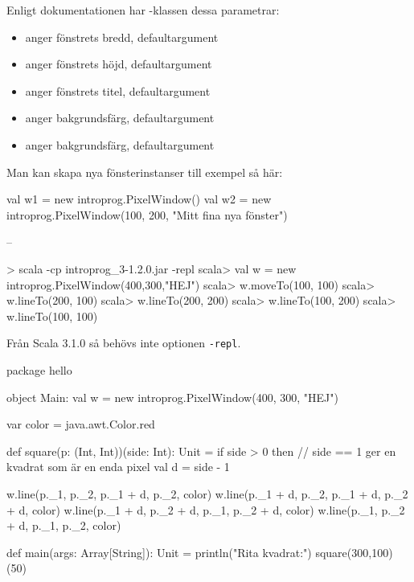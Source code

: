 \SubtaskSolved Enligt dokumentationen har -klassen dessa parametrar:
\begin{itemize}[nolistsep,noitemsep]
  \item {} anger fönstrets bredd, defaultargument 
  \item {} anger fönstrets höjd, defaultargument 
  \item {} anger fönstrets titel, defaultargument 
  \item {} anger bakgrundsfärg, defaultargument 
  \item {} anger bakgrundsfärg, defaultargument 
\end{itemize}
Man kan skapa nya fönsterinstanser till exempel så här:
\begin{Code}
val w1 = new introprog.PixelWindow()
val w2 = new introprog.PixelWindow(100, 200, "Mitt fina nya fönster")
\end{Code}

\SubtaskSolved --

\SubtaskSolved
\begin{REPL}
> scala -cp introprog_3-1.2.0.jar -repl
scala> val w = new introprog.PixelWindow(400,300,"HEJ")
scala> w.moveTo(100, 100)
scala> w.lineTo(200, 100)
scala> w.lineTo(200, 200)
scala> w.lineTo(100, 200)
scala> w.lineTo(100, 100)
\end{REPL}
Från Scala 3.1.0 så behövs inte optionen \texttt{-repl}.

\SubtaskSolved
\begin{Code}
package hello

object Main:
  val w = new introprog.PixelWindow(400, 300, "HEJ")

  var color = java.awt.Color.red

  def square(p: (Int, Int))(side: Int): Unit =
    if side > 0 then
      // side == 1 ger en kvadrat som är en enda pixel
      val d = side - 1  
      
      w.line(p._1,     p._2,     p._1 + d, p._2,     color)
      w.line(p._1 + d, p._2,     p._1 + d, p._2 + d, color)
      w.line(p._1 + d, p._2 + d, p._1,     p._2 + d, color)
      w.line(p._1,     p._2 + d, p._1,     p._2,     color)

  def main(args: Array[String]): Unit =
    println("Rita kvadrat:")
    square(300,100)(50)

\end{Code}


